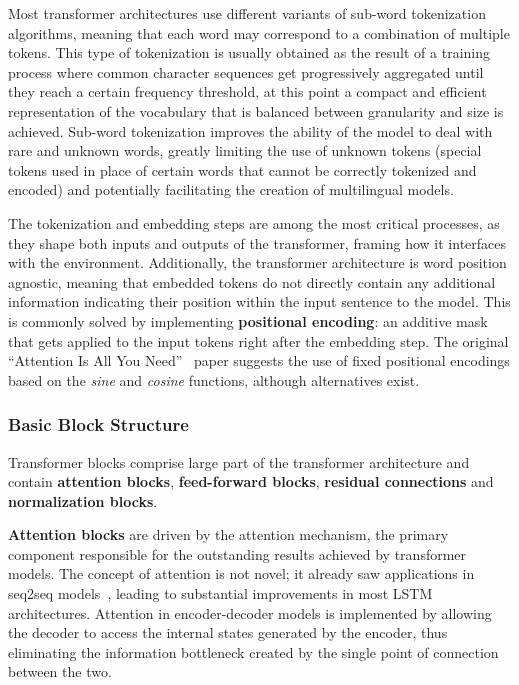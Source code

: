 Most transformer architectures use different variants of sub-word tokenization algorithms, meaning that each word may correspond to a combination of multiple tokens.
This type of tokenization is usually obtained as the result of a training process where common character sequences get progressively aggregated until they reach a certain frequency threshold, at this point a compact and efficient representation of the vocabulary that is balanced between granularity and size is achieved.
Sub-word tokenization improves the ability of the model to deal with rare and unknown words, greatly limiting the use of unknown tokens (special tokens used in place of certain words that cannot be correctly tokenized and encoded) and potentially facilitating the creation of multilingual models.

The tokenization and embedding steps are among the most critical processes, as they shape both inputs and outputs of the transformer, framing how it interfaces with the environment.
Additionally, the transformer architecture is word position agnostic, meaning that embedded tokens do not directly contain any additional information indicating their position within the input sentence to the model.
This is commonly solved by implementing \textbf{positional encoding}: an additive mask that gets applied to the input tokens right after the embedding step.
The original ``Attention Is All You Need''~\cite{vaswani2017} paper suggests the use of fixed positional encodings based on the \emph{sine} and \emph{cosine} functions, although alternatives exist.

\subsubsection*{Basic Block Structure}

Transformer blocks comprise large part of the transformer architecture and contain \textbf{attention blocks}, \textbf{feed-forward blocks}, \textbf{residual connections} and \textbf{normalization blocks}.

\textbf{Attention blocks} are driven by the attention mechanism, the primary component responsible for the outstanding results achieved by transformer models.
The concept of attention is not novel; it already saw applications in seq2seq models~\cite{bahdanau2015,kim2017,cho2015}, leading to substantial improvements in most LSTM architectures.
Attention in encoder-decoder models is implemented by allowing the decoder to access the internal states generated by the encoder, thus eliminating the information bottleneck created by the single point of connection between the two.

